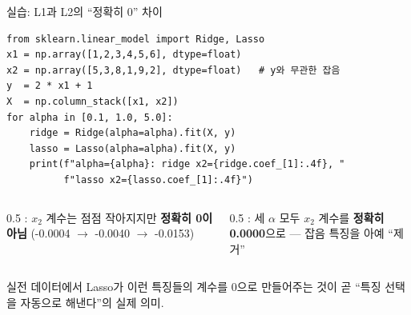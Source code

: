 \begin{frame}[fragile]{실습: L1과 L2의 ``정확히 0'' 차이}
  \small
\begin{lstlisting}
from sklearn.linear_model import Ridge, Lasso
x1 = np.array([1,2,3,4,5,6], dtype=float)
x2 = np.array([5,3,8,1,9,2], dtype=float)   # y와 무관한 잡음
y  = 2 * x1 + 1
X  = np.column_stack([x1, x2])
for alpha in [0.1, 1.0, 5.0]:
    ridge = Ridge(alpha=alpha).fit(X, y)
    lasso = Lasso(alpha=alpha).fit(X, y)
    print(f"alpha={alpha}: ridge x2={ridge.coef_[1]:.4f}, "
          f"lasso x2={lasso.coef_[1]:.4f}")
\end{lstlisting}
\begin{columns}[T]
  \begin{column}{0.5\textwidth}
    : $x_2$ 계수는 점점 작아지지만
    \textbf{정확히 0이 아님}
    (-0.0004 $\to$ -0.0040 $\to$ -0.0153)
  \end{column}
  \begin{column}{0.5\textwidth}
    : 세 $\alpha$ 모두 $x_2$ 계수를 \textbf{정확히
    0.0000}으로 — 잡음 특징을 아예 ``제거''
  \end{column}
\end{columns}
  {\footnotesize 실전 데이터에서 Lasso가 이런 특징들의 계수를 0으로
  만들어주는 것이 곧 ``특징 선택을 자동으로 해낸다''의 실제 의미.}
\end{frame}
